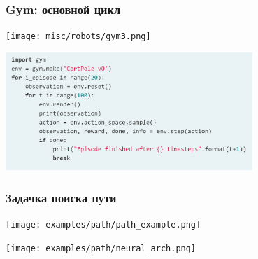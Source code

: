 \documentclass[default]{beamer}
\begin{document}
	\begin{frame}
		\frametitle{Gym: основной цикл}
		
		\centering
				
		\texttt{[image: misc/robots/gym3.png]}
		\par\bigskip
		\includegraphics[width=0.7\textwidth]{code2.png}
	\end{frame}	
	
	\begin{frame}
		\frametitle{Задачка поиска пути}
		
		\centering
		
		\texttt{[image: examples/path/path\_example.png]}
		\par\bigskip
		\texttt{[image: examples/path/neural\_arch.png]}
	\end{frame}
	
\end{document}
